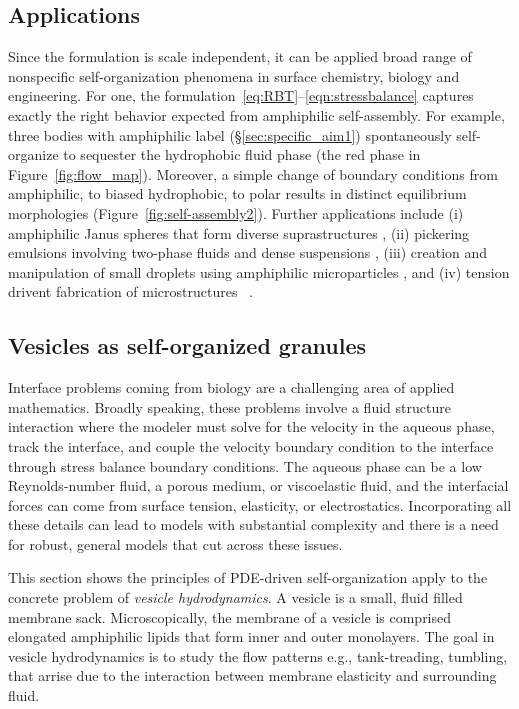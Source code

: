 \subsection{Applications}
Since the formulation is scale independent, it can be applied broad
range of nonspecific self-organization phenomena in surface chemistry,
biology and engineering. For one, the
formulation~\eqref{eq:RBT}--\eqref{eqn:stressbalance} captures exactly
the right behavior expected from amphiphilic self-assembly.
For example,
three bodies with amphiphilic label (\S\ref{sec:specific_aim1})
spontaneously self-organize to sequester the hydrophobic fluid phase
(the red phase in Figure~\ref{fig:flow_map}).
Moreover, a simple change
of boundary conditions from amphiphilic,
to biased hydrophobic, to polar
results in distinct equilibrium morphologies
(Figure~\ref{fig:self-assembly2}).
Further applications include
(i) amphiphilic Janus spheres that form diverse suprastructures
\cite{HaBr20,McBr21,Bradley2017},
(ii) pickering emulsions involving
two-phase fluids and dense suspensions \cite{Bradley2016},
(iii) creation and manipulation of small droplets
using amphiphilic microparticles \cite{Ha2022SurfaceEM,Ha2020MinimalSC},
and (iv) tension drivent fabrication of microstructures
~\cite{Dasgupta2017, Leong2007, Reynolds2019, Cho2010,Zeng20223DprintedMT,Russell2016EnergyLF}.



\subsection{Vesicles as self-organized granules}
\label{sec:vesicles_as_granules}
Interface problems coming from biology are a challenging
area of applied mathematics.  Broadly speaking, these problems
involve a fluid structure interaction where the modeler must
solve for the velocity in the aqueous phase, track the interface,
and couple the velocity boundary condition to the interface through
stress balance boundary conditions.  The aqueous phase can
be a low Reynolds-number fluid, a porous medium, or viscoelastic fluid,
and the interfacial forces can come from surface tension, elasticity,
or electrostatics.
Incorporating all these details can lead to models with substantial
complexity and there is a need for robust, general models that
cut across these issues. 

This section shows the principles of PDE-driven
self-organization apply to the concrete
problem of \emph{vesicle hydrodynamics}.
A vesicle is a small, fluid filled membrane sack.
Microscopically, the membrane of a vesicle is comprised
elongated amphiphilic lipids that form inner and outer monolayers.  
The goal in vesicle hydrodynamics is to study the flow patterns e.g.,
tank-treading, tumbling, that arrise due to the interaction
between membrane elasticity and surrounding fluid.

